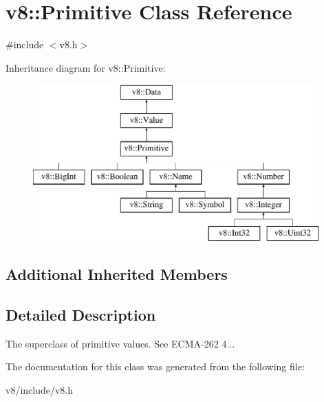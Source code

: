 \hypertarget{classv8_1_1Primitive}{\section{v8\-:\-:Primitive Class Reference}
\label{classv8_1_1Primitive}
}


{\ttfamily \#include $<$v8.\-h$>$}

Inheritance diagram for v8\-:\-:Primitive\-:\begin{figure}[H]
\begin{center}
\leavevmode
\includegraphics[height=6.000000cm]{classv8_1_1Primitive}
\end{center}
\end{figure}
\subsection*{Additional Inherited Members}


\subsection{Detailed Description}
The superclass of primitive values. See E\-C\-M\-A-\/262 4... 

The documentation for this class was generated from the following file\-:\begin{DoxyCompactItemize}
\item 
v8/include/v8.\-h\end{DoxyCompactItemize}
